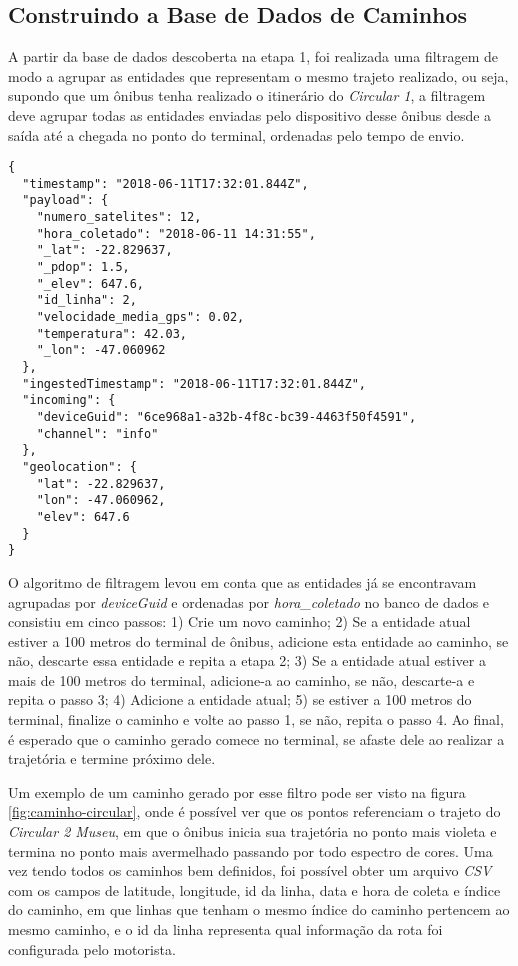 \documentclass[11pt,twoside]{article}
\begin{document}
\subsection{Construindo a Base de Dados de Caminhos}

A partir da base de dados descoberta na etapa 1, foi realizada uma filtragem de modo a agrupar as entidades que representam o mesmo trajeto realizado, ou seja, supondo que um ônibus tenha realizado o itinerário do \emph{Circular 1}, a filtragem deve agrupar todas as entidades enviadas pelo dispositivo desse ônibus desde a saída até a chegada no ponto do terminal, ordenadas pelo tempo de envio. 

\begin{lstlisting}[caption={Exemplo de entidade JSON presente no Banco de Dados}, label=json]
{
  "timestamp": "2018-06-11T17:32:01.844Z",
  "payload": {
    "numero_satelites": 12,
    "hora_coletado": "2018-06-11 14:31:55",
    "_lat": -22.829637,
    "_pdop": 1.5,
    "_elev": 647.6,
    "id_linha": 2,
    "velocidade_media_gps": 0.02,
    "temperatura": 42.03,
    "_lon": -47.060962
  },
  "ingestedTimestamp": "2018-06-11T17:32:01.844Z",
  "incoming": {
    "deviceGuid": "6ce968a1-a32b-4f8c-bc39-4463f50f4591",
    "channel": "info"
  },
  "geolocation": {
    "lat": -22.829637,
    "lon": -47.060962,
    "elev": 647.6
  }
}
\end{lstlisting}

O algoritmo de filtragem levou em conta que as entidades já se encontravam agrupadas por \emph{deviceGuid} e ordenadas por \emph{hora\_coletado} no banco de dados e consistiu em cinco passos: 1) Crie um novo caminho; 2) Se a entidade atual estiver a 100 metros do terminal de ônibus, adicione esta entidade ao caminho, se não, descarte essa entidade e repita a etapa 2; 3) Se a entidade atual estiver a mais de 100 metros do terminal, adicione-a ao caminho, se não, descarte-a e repita o passo 3; 4) Adicione a entidade atual; 5) se estiver a 100 metros do terminal, finalize o caminho e volte ao passo 1, se não, repita o passo 4. Ao final, é esperado que o caminho gerado comece no terminal, se afaste dele ao realizar a trajetória e termine próximo dele. 

Um exemplo de um caminho gerado por esse filtro pode ser visto na figura \ref{fig:caminho-circular}, onde é possível ver que os pontos referenciam o trajeto do \emph{Circular 2 Museu}, em que o ônibus inicia sua trajetória no ponto mais violeta e termina no ponto mais avermelhado passando por todo espectro de cores. Uma vez tendo todos os caminhos bem definidos, foi possível obter um arquivo \emph{CSV} com os campos de latitude, longitude, id da linha, data e hora de coleta e índice do caminho, em que linhas que tenham o mesmo índice do caminho pertencem ao mesmo caminho, e o id da linha representa qual informação da rota foi configurada pelo motorista.
\end{document}
